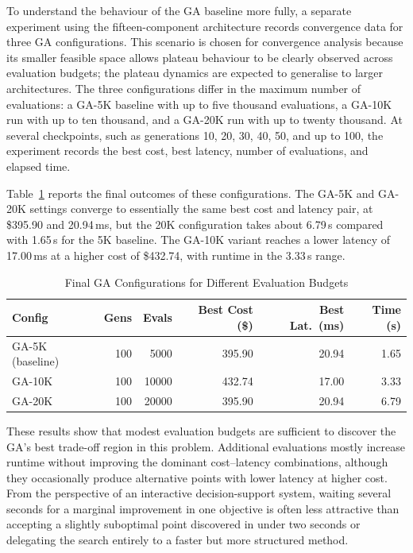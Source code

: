 \documentclass[journal]{IEEEtran}
\begin{document}
To understand the behaviour of the GA baseline more fully, a separate experiment
using the fifteen-component architecture records convergence data for three GA
configurations. This scenario is chosen for convergence analysis because its
smaller feasible space allows plateau behaviour to be clearly observed across
evaluation budgets; the plateau dynamics are expected to generalise to larger
architectures. The three configurations differ in the maximum number of
evaluations: a GA-5K baseline with up to five thousand evaluations, a GA-10K
run with up to ten thousand, and a GA-20K run with up to twenty thousand. At
several checkpoints, such as generations 10, 20, 30, 40, 50, and up to 100,
the experiment records the best cost, best latency, number of evaluations, and
elapsed time.

Table~\ref{tab:gaconverge} reports the final outcomes of these configurations.
The GA-5K and GA-20K settings converge to essentially the same best cost and
latency pair, at \$395.90 and 20.94\,ms, but the 20K configuration takes about
6.79\,s compared with 1.65\,s for the 5K baseline. The GA-10K variant reaches a
lower latency of 17.00\,ms at a higher cost of \$432.74, with runtime in the
3.33\,s range.

\begin{table}[t]
\centering
\caption{Final GA Configurations for Different Evaluation Budgets}
\label{tab:gaconverge}
\footnotesize
\setlength{\tabcolsep}{3pt}
\begin{tabular}{@{}lrrrrr@{}}
\toprule
Config          & Gens & Evals & Best Cost (\$) & Best Lat.\ (ms) & Time (s) \\
\midrule
GA-5K (baseline) & 100  & 5000  & 395.90         & 20.94           & 1.65     \\
GA-10K           & 100  & 10000 & 432.74         & 17.00           & 3.33     \\
GA-20K           & 100  & 20000 & 395.90         & 20.94           & 6.79     \\
\bottomrule
\end{tabular}
\end{table}

These results show that modest evaluation budgets are sufficient to discover
the GA's best trade-off region in this problem. Additional evaluations mostly
increase runtime without improving the dominant cost--latency combinations,
although they occasionally produce alternative points with lower latency at
higher cost. From the perspective of an interactive decision-support system,
waiting several seconds for a marginal improvement in one objective is often
less attractive than accepting a slightly suboptimal point discovered in under
two seconds or delegating the search entirely to a faster but more structured
method.
\end{document}
